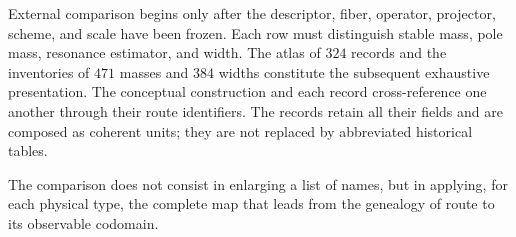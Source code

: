 External comparison begins only after the descriptor, fiber, operator, projector, scheme, and scale have been frozen. Each row must distinguish stable mass, pole mass, resonance estimator, and width. The atlas of \(324\) records and the inventories of \(471\) masses and \(384\) widths constitute the subsequent exhaustive presentation. The conceptual construction and each record cross-reference one another through their route identifiers. The records retain all their fields and are composed as coherent units; they are not replaced by abbreviated historical tables.

The comparison does not consist in enlarging a list of names, but in applying,
for each physical type, the complete map that leads from the genealogy of route
to its observable codomain.
